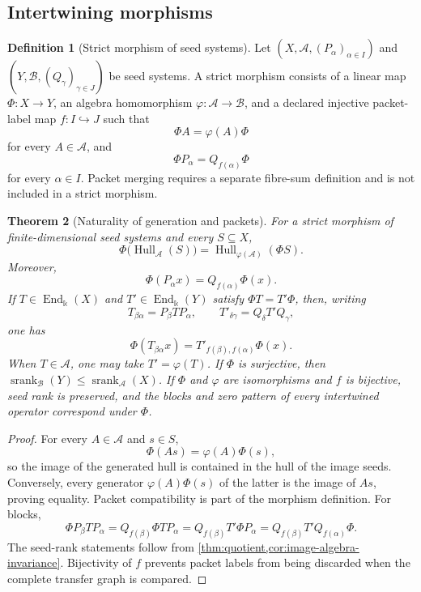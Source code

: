 \documentclass[11pt]{article}
\newtheorem{theorem}{Theorem}[section]
\theoremstyle{definition}
\newtheorem{definition}[theorem]{Definition}
\theoremstyle{remark}
\newcommand{\cA}{\mathcal A}
\newcommand{\cB}{\mathcal B}
\newcommand{\Hull}{\operatorname{Hull}}
\newcommand{\srank}{\operatorname{srank}}
\newcommand{\End}{\operatorname{End}}
\newcommand{\bbk}{\mathbb{k}}
\begin{document}
\subsection{Intertwining morphisms}

\begin{definition}[Strict morphism of seed systems]
Let $(X,\cA,(P_{\alpha})_{\alpha\in I})$ and $(Y,\cB,(Q_{\gamma})_{\gamma\in J})$ be seed systems. A strict morphism consists of a linear map $\Phi:X\to Y$, an algebra homomorphism $\varphi:\cA\to\cB$, and a declared injective packet-label map $f:I\hookrightarrow J$ such that
\[
\Phi A=\varphi(A)\Phi
\]
for every $A\in\cA$, and
\[
\Phi P_{\alpha}=Q_{f(\alpha)}\Phi
\]
for every $\alpha\in I$. Packet merging requires a separate fibre-sum definition and is not included in a strict morphism.
\end{definition}

\begin{theorem}[Naturality of generation and packets]
\label{thm:naturality}
For a strict morphism of finite-dimensional seed systems and every $S\subseteq X$,
\[
\Phi\bigl(\Hull_{\cA}(S)\bigr)
=
\Hull_{\varphi(\cA)}(\Phi S).
\]
Moreover,
\[
\Phi(P_{\alpha}x)=Q_{f(\alpha)}\Phi(x).
\]
If $T\in\End_{\bbk}(X)$ and $T'\in\End_{\bbk}(Y)$ satisfy $\Phi T=T'\Phi$, then, writing
\[
T_{\beta\alpha}=P_{\beta}TP_{\alpha},
\qquad
T'_{\delta\gamma}=Q_{\delta}T'Q_{\gamma},
\]
one has
\[
\Phi(T_{\beta\alpha}x)
=
T'_{f(\beta),f(\alpha)}\Phi(x).
\]
When $T\in\cA$, one may take $T'=\varphi(T)$. If $\Phi$ is surjective, then $\srank_{\cB}(Y)\le\srank_{\cA}(X)$. If $\Phi$ and $\varphi$ are isomorphisms and $f$ is bijective, seed rank is preserved, and the blocks and zero pattern of every intertwined operator correspond under $\Phi$.
\end{theorem}

\begin{proof}
For every $A\in\cA$ and $s\in S$,
\[
\Phi(As)=\varphi(A)\Phi(s),
\]
so the image of the generated hull is contained in the hull of the image seeds. Conversely, every generator $\varphi(A)\Phi(s)$ of the latter is the image of $As$, proving equality. Packet compatibility is part of the morphism definition. For blocks,
\[
\Phi P_{\beta}TP_{\alpha}
=Q_{f(\beta)}\Phi TP_{\alpha}
=Q_{f(\beta)}T'\Phi P_{\alpha}
=Q_{f(\beta)}T'Q_{f(\alpha)}\Phi.
\]
The seed-rank statements follow from \cref{thm:quotient,cor:image-algebra-invariance}. Bijectivity of $f$ prevents packet labels from being discarded when the complete transfer graph is compared.
\end{proof}
\end{document}
